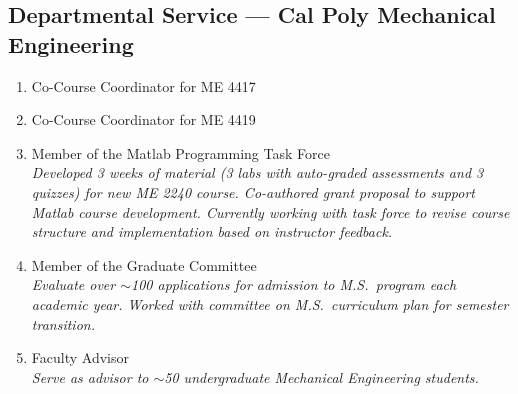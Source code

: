 \subsection{Departmental Service --- Cal Poly Mechanical Engineering}
\begin{enumerate}[label={\arabic*.}]
	\item Co-Course Coordinator for ME 4417 
	\item Co-Course Coordinator for ME 4419 
	\item Member of the Matlab Programming Task Force  \\
	\textit{Developed 3 weeks of material (3 labs with auto-graded assessments and 3 quizzes) for new ME 2240 course. Co-authored grant proposal to support Matlab course development. Currently working with task force to revise course structure and implementation based on instructor feedback.}
	\item Member of the Graduate Committee  \\
	\textit{Evaluate over $\sim$100 applications for admission to M.S.\ program each academic year. Worked with committee on M.S.\ curriculum plan for semester transition.}
	\item Faculty Advisor  \\
	\textit{Serve as advisor to $\sim$50 undergraduate Mechanical Engineering students.}
\end{enumerate}

\vspace*{\subsectionskip}

